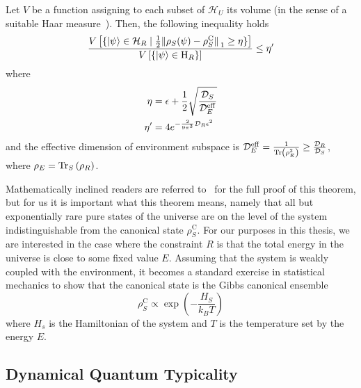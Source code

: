 \begin{theorem}
	Let \(V\) be a function assigning to each subset of \(\mathcal{H}_U\) its volume (in the sense of a suitable Haar measure~\autocite{VitaliD.Milman1986}).
	Then, the following inequality holds
	\begin{equation}
		\frac{V\left[\{\ket{\psi}\in\mathcal{H}_R \mid \frac{1}{2}\norm*{\rho_S(\psi) - \rho_S^{\mathrm{C}}}_1\geq \eta\}\right]}
		{V\left[\{\ket{\psi}\in \mathrm{H}_R\}\right]} \leq \eta^{\prime}
	\end{equation}
	where 
	\begin{align*}
		\eta &= \epsilon + \frac{1}{2}\sqrt{\frac{\mathcal{D}_S}{\mathcal{D}_E^{\mathrm{eff}}}}\\
		\eta^{\prime} &= 4 e^{-\frac{2}{9\pi^3} \mathcal{D}_R \epsilon^2 }
	\end{align*}
	and the effective dimension of environment subspace is \(\mathcal{D}_E^{\mathrm{eff}} = 
	\frac{1}{\Tr\left(\rho_E^2\right)}\geq \frac{\mathcal{D}_R}{\mathcal{D}_S}\), where \(\rho_E = \Tr_S\left(\rho_R\right)\).
\end{theorem}
Mathematically inclined readers are
referred to~\textcite{Popescu2006a} for the full proof of this theorem, but for us it is important
what this theorem means, namely that all but exponentially rare pure states of the universe are on the level of the system
indistinguishable from the canonical state \(\rho_S^{\mathrm{C}}\). 
For our purposes in this thesis, we are interested in the case where the constraint \(R\) is that the total energy
in the universe is close to some fixed value \(E\). Assuming that the system is weakly coupled with the environment, it
becomes a standard exercise in statistical mechanics to show that the canonical state is the Gibbs canonical ensemble
\begin{equation}
	\rho_S^{\mathrm{C}} \propto \exp\left(-\frac{H_S}{k_B T}\right)
\end{equation}
where \(H_s\) is the Hamiltonian of the system and \(T\) is the temperature set by the energy \(E\).


\subsection{\label{sec:DQT} Dynamical Quantum Typicality}

